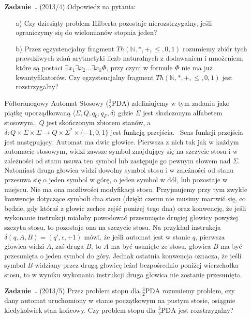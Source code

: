 \documentclass[11pt]{article}
\newcounter{exercise}
\newenvironment{exercise}[1]{\refstepcounter{exercise}\par\medskip
   \noindent\textbf{Zadanie~\theexercise.} (#1) \rmfamily}{\medskip}
\begin{document}
\begin{exercise}{2013/4}
Odpowiedz na pytania:
\begin{itemize}
    \item[a)] Czy dziesiąty problem Hilberta pozostaje nierozstrzygalny, jeśli ograniczymy się do wielomianów stopnia jeden?
    \item[b)] Przez egzystencjalny fragment $Th(\mathbb{N},*,+,\leq,0,1)$ rozumiemy zbiór tych prawdziwych zdań arytmetyki liczb naturalnych z dodawaniem i mnożeniem, które są postaci $\exists x_1 \exists x_2 ... \exists x_k \Phi$, przy czym w formule $\Phi$ nie ma już kwantyfikatorów. Czy egzystencjalny fragment $Th(\mathbb{N},*,+,\leq,0,1)$ jest rozstrzygalny?
\end{itemize}
\end{exercise}

\bigskip
Półtoranogowy Automat Stosowy ($\frac{3}{2}\text{PDA}$) zdefiniujemy w tym zadaniu jako piątkę uporządkowaną $\langle\Sigma,Q,q_0,q_F,\delta\rangle$ gdzie $\Sigma$ jest skończonym alfabetem stosowym,, $Q$ jest skończonym zbiorem stanów, a $\delta : Q \times \Sigma \times \Sigma \rightarrow Q \times \Sigma^* \times \{-1,0,1\}$ jest funkcją przejścia.
\
Sens funkcji przejścia jest następujący: Automat ma dwie głowice. Pierwsza z nich tak jak w każdym automacie stosowym, widzi zawsze symbol znajdujący się na szczycie stosu i w zależności od stanu usuwa ten symbol lub zastępuje go pewnym słowem nad $\Sigma$. Natomiast druga głowica widzi dowolny symbol stosu i w zależności od stanu przesuwa się o jeden symbol w górę, o jeden symbol w dół, lub pozostaje w miejscu. Nie ma ona możliwości modyfikacji stosu. Przyjmujemy przy tym zwykłe konwencje dotyczące symboli dna stosu (dzięki czemu nie musimy martwić się, co będzie, gdy któraś z głowic zechce zejść poniżej tego dna) oraz konwencję, że jeśli wykonanie instrukcji miałoby powodować przesunięcie drugiej głowicy powyżej szczytu stosu, to pozostaje ona na szczycie stosu. Na przykład instrukcja $\delta(q,A,B)=(q',\epsilon,+1)$ mówi, że jeśli automat jest w stanie $q$, pierwsza głowica widzi $A$, zaś druga $B$, to $A$ ma być usunięte ze stosu, głowica $B$ ma być przesunięta o jeden symbol do góry. Jednak ostatnia konwencja oznacza, że jeśli symbol $B$ widziany przez drugą głowicę leżał bezpośrednio poniżej wierzchołka stosu, to w wyniku wykonania instrukcji druga głowica nie zostanie przesunięta.

\begin{exercise}{2013/5}
Przez problem stopu dla $\frac{3}{2}\text{PDA}$ rozumiemy problem, czy dany automat uruchomiony w stanie początkowym na pustym stosie, osiągnie kiedykolwiek stan końcowy. Czy problem stopu dla $\frac{3}{2}\text{PDA}$ jest rozstrzygalny?
\end{exercise}
\end{document}
